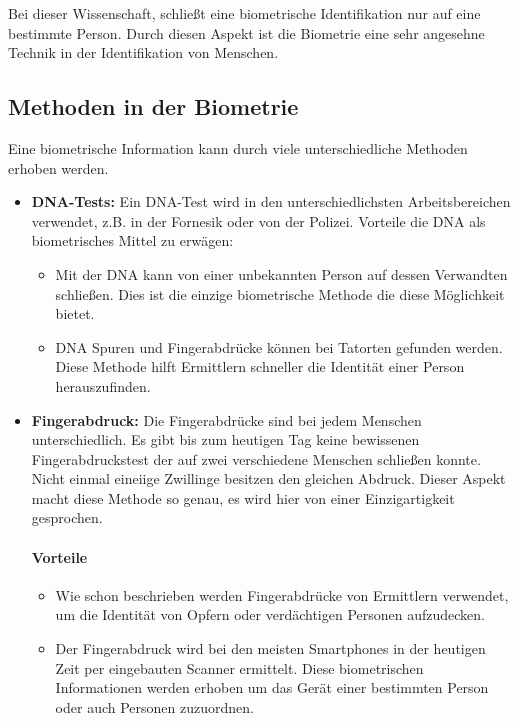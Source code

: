 Bei dieser Wissenschaft, schließt eine biometrische Identifikation nur auf eine bestimmte Person.
Durch diesen Aspekt ist die Biometrie eine sehr angesehne Technik in der Identifikation von Menschen.

\subsection{Methoden in der Biometrie}
Eine biometrische Information kann durch viele unterschiedliche Methoden erhoben werden.
\begin{itemize}
	\item \textbf{DNA-Tests:} Ein DNA-Test wird in den unterschiedlichsten Arbeitsbereichen verwendet, z.B. in der Fornesik oder von der Polizei.
	Vorteile die DNA als biometrisches Mittel zu erwägen:
	\begin{itemize}
		\item Mit der DNA kann von einer unbekannten Person auf dessen Verwandten schließen. Dies ist die einzige biometrische Methode die diese Möglichkeit bietet.
		\item DNA Spuren und Fingerabdrücke können bei Tatorten gefunden werden. Diese Methode hilft Ermittlern schneller die Identität einer Person herauszufinden.
	\end{itemize}
	\item \textbf{Fingerabdruck:} Die Fingerabdrücke sind bei jedem Menschen unterschiedlich. 
	Es gibt bis zum heutigen Tag keine bewissenen Fingerabdruckstest der auf zwei verschiedene Menschen schließen konnte. 
	Nicht einmal eineiige Zwillinge besitzen den gleichen Abdruck.
	Dieser Aspekt macht diese Methode so genau, es wird hier von einer Einzigartigkeit gesprochen.
	\paragraph{Vorteile}
	\begin{itemize}
		\item Wie schon beschrieben werden Fingerabdrücke von Ermittlern verwendet, um die Identität von Opfern oder verdächtigen Personen aufzudecken.
		\item Der Fingerabdruck wird bei den meisten Smartphones in der heutigen Zeit per eingebauten Scanner ermittelt. Diese biometrischen Informationen werden erhoben um das Gerät einer bestimmten Person oder auch Personen zuzuordnen.
	\end{itemize}

\end{itemize}
